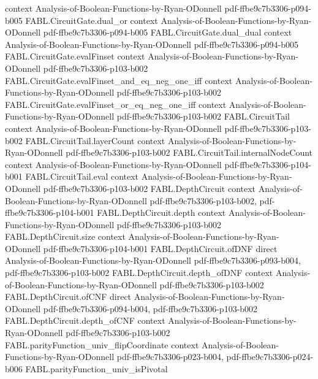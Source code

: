\begin{theorem}
  {context}
  {Analysis-of-Boolean-Functions-by-Ryan-ODonnell}
  {pdf-ffbe9c7b3306-p094-b005}
\proofstep
  {FABL.CircuitGate.dual_or}
  {context}
  {Analysis-of-Boolean-Functions-by-Ryan-ODonnell}
  {pdf-ffbe9c7b3306-p094-b005}
\proofstep
  {FABL.CircuitGate.dual_dual}
  {context}
  {Analysis-of-Boolean-Functions-by-Ryan-ODonnell}
  {pdf-ffbe9c7b3306-p094-b005}
\proofstep
  {FABL.CircuitGate.evalFinset}
  {context}
  {Analysis-of-Boolean-Functions-by-Ryan-ODonnell}
  {pdf-ffbe9c7b3306-p103-b002}
\proofstep
  {FABL.CircuitGate.evalFinset_and_eq_neg_one_iff}
  {context}
  {Analysis-of-Boolean-Functions-by-Ryan-ODonnell}
  {pdf-ffbe9c7b3306-p103-b002}
\proofstep
  {FABL.CircuitGate.evalFinset_or_eq_neg_one_iff}
  {context}
  {Analysis-of-Boolean-Functions-by-Ryan-ODonnell}
  {pdf-ffbe9c7b3306-p103-b002}
\proofstep
  {FABL.CircuitTail}
  {context}
  {Analysis-of-Boolean-Functions-by-Ryan-ODonnell}
  {pdf-ffbe9c7b3306-p103-b002}
\proofstep
  {FABL.CircuitTail.layerCount}
  {context}
  {Analysis-of-Boolean-Functions-by-Ryan-ODonnell}
  {pdf-ffbe9c7b3306-p103-b002}
\proofstep
  {FABL.CircuitTail.internalNodeCount}
  {context}
  {Analysis-of-Boolean-Functions-by-Ryan-ODonnell}
  {pdf-ffbe9c7b3306-p104-b001}
\proofstep
  {FABL.CircuitTail.eval}
  {context}
  {Analysis-of-Boolean-Functions-by-Ryan-ODonnell}
  {pdf-ffbe9c7b3306-p103-b002}
\proofstep
  {FABL.DepthCircuit}
  {context}
  {Analysis-of-Boolean-Functions-by-Ryan-ODonnell}
  {pdf-ffbe9c7b3306-p103-b002,
    pdf-ffbe9c7b3306-p104-b001}
\proofstep
  {FABL.DepthCircuit.depth}
  {context}
  {Analysis-of-Boolean-Functions-by-Ryan-ODonnell}
  {pdf-ffbe9c7b3306-p103-b002}
\proofstep
  {FABL.DepthCircuit.size}
  {context}
  {Analysis-of-Boolean-Functions-by-Ryan-ODonnell}
  {pdf-ffbe9c7b3306-p104-b001}
\proofstep
  {FABL.DepthCircuit.ofDNF}
  {direct}
  {Analysis-of-Boolean-Functions-by-Ryan-ODonnell}
  {pdf-ffbe9c7b3306-p093-b004,
    pdf-ffbe9c7b3306-p103-b002}
\proofstep
  {FABL.DepthCircuit.depth_ofDNF}
  {context}
  {Analysis-of-Boolean-Functions-by-Ryan-ODonnell}
  {pdf-ffbe9c7b3306-p103-b002}
\proofstep
  {FABL.DepthCircuit.ofCNF}
  {direct}
  {Analysis-of-Boolean-Functions-by-Ryan-ODonnell}
  {pdf-ffbe9c7b3306-p094-b004,
    pdf-ffbe9c7b3306-p103-b002}
\proofstep
  {FABL.DepthCircuit.depth_ofCNF}
  {context}
  {Analysis-of-Boolean-Functions-by-Ryan-ODonnell}
  {pdf-ffbe9c7b3306-p103-b002}
\proofstep
  {FABL.parityFunction_univ_flipCoordinate}
  {context}
  {Analysis-of-Boolean-Functions-by-Ryan-ODonnell}
  {pdf-ffbe9c7b3306-p023-b004,
    pdf-ffbe9c7b3306-p024-b006}
\proofstep
  {FABL.parityFunction_univ_isPivotal}

\end{theorem}
